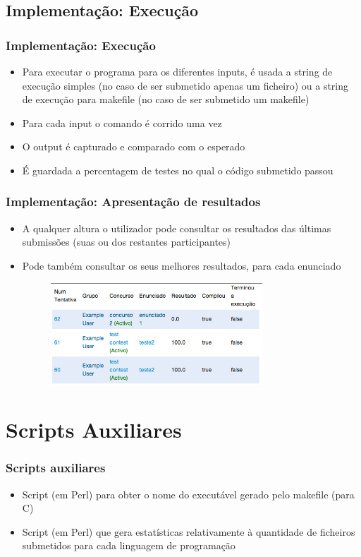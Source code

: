 \documentclass{beamer}
\begin{document}
\subsection{Implementação: Execução}
\begin{frame} \frametitle{Implementação: Execução}
\begin{itemize}
\item Para executar o programa para os diferentes inputs, é usada a string de execução simples (no caso de ser submetido
apenas um ficheiro) ou a string de execução para makefile (no caso de ser submetido um makefile)
\item Para cada input o comando é corrido uma vez
\item O output é capturado e comparado com o esperado
\item É guardada a percentagem de testes no qual o código submetido passou
\end{itemize}
\end{frame}

\begin{frame} \frametitle{Implementação: Apresentação de resultados}
\begin{itemize}
\item A qualquer altura o utilizador pode consultar os resultados das últimas submissões (suas ou dos restantes 
participantes)
\item Pode também consultar os seus melhores resultados, para cada enunciado

\begin{figure}[H]
\begin{center}
\includegraphics[width=0.75\textwidth]{imagens/tentativas}
\end{center}
\end{figure} 

\end{itemize}
\end{frame}

\section{Scripts Auxiliares}
\begin{frame} \frametitle{Scripts auxiliares}
\begin{itemize} 
\item Script (em Perl) para obter o nome do executável gerado pelo makefile (para C)
\item Script (em Perl) que gera estatísticas relativamente à quantidade de ficheiros submetidos para cada linguagem de programação
\end{itemize}
\end{frame}
\end{document}
